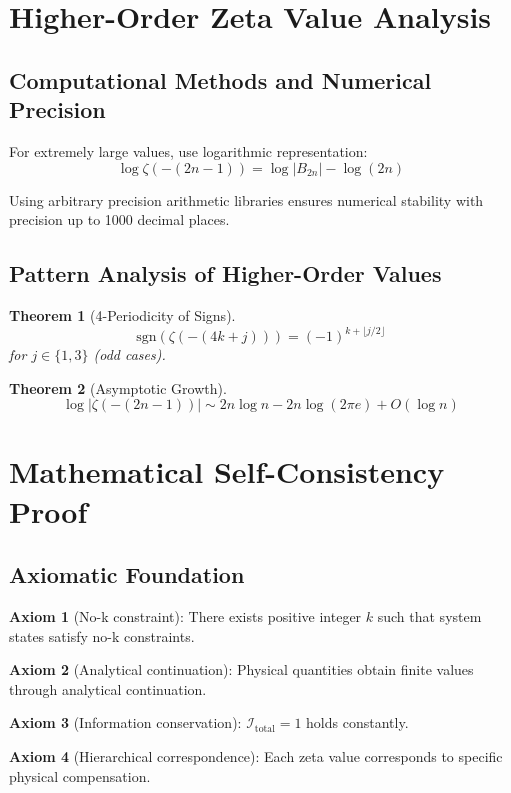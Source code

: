 \documentclass[12pt]{article}
\newtheorem{theorem}{Theorem}[section]
\begin{document}
\section{Higher-Order Zeta Value Analysis}

\subsection{Computational Methods and Numerical Precision}

For extremely large values, use logarithmic representation:
$$\log\zeta(-(2n-1)) = \log|B_{2n}| - \log(2n)$$

Using arbitrary precision arithmetic libraries ensures numerical stability with precision up to 1000 decimal places.

\subsection{Pattern Analysis of Higher-Order Values}

\begin{theorem}[4-Periodicity of Signs]
$$\text{sgn}(\zeta(-(4k+j))) = (-1)^{k+\lfloor j/2 \rfloor}$$
for $j \in \{1,3\}$ (odd cases).
\end{theorem}

\begin{theorem}[Asymptotic Growth]
$$\log|\zeta(-(2n-1))| \sim 2n \log n - 2n \log(2\pi e) + O(\log n)$$
\end{theorem}

\section{Mathematical Self-Consistency Proof}

\subsection{Axiomatic Foundation}

\textbf{Axiom 1} (No-k constraint): There exists positive integer $k$ such that system states satisfy no-k constraints.

\textbf{Axiom 2} (Analytical continuation): Physical quantities obtain finite values through analytical continuation.

\textbf{Axiom 3} (Information conservation): $\mathcal{I}_{\text{total}} = 1$ holds constantly.

\textbf{Axiom 4} (Hierarchical correspondence): Each zeta value corresponds to specific physical compensation.
\end{document}

